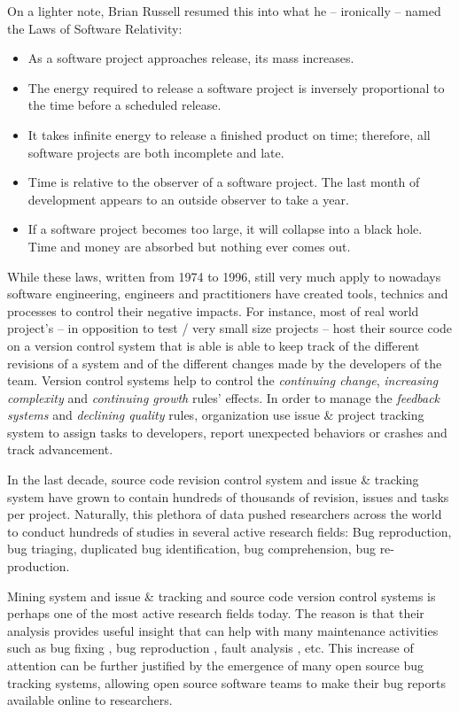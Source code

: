 On a lighter note, Brian Russell resumed this into what he -- ironically -- named the Laws of Software Relativity:

\begin{itemize}
\item As a software project approaches release, its mass increases.
\item The energy required to release a software project is inversely proportional to the time before a scheduled release.
\item It takes infinite energy to release a finished product on time; therefore, all software projects are both incomplete and late.
\item Time is relative to the observer of a software project. The last month of development appears to an outside observer to take a year.
\item If a software project becomes too large, it will collapse into a black hole. Time and money are absorbed but nothing ever comes out.
\end{itemize}

While these laws, written from 1974 to 1996, still very much apply to nowadays software engineering, engineers and practitioners have created tools, technics and processes to control their negative impacts.
For instance, most of real world project's -- in opposition to test / very small size projects -- host their source code on a version control system \cite{rochkind1975source} that is able is able to keep track of the different revisions of a system and of the different changes made by the developers of the team.
Version control systems help to control the {\it continuing change}, {\it increasing complexity} and {\it continuing growth} rules' effects.
In order to manage the {\it feedback systems} and {\it declining quality} rules, organization use issue \& project tracking system to assign tasks to developers, report unexpected behaviors or crashes and track advancement.

In the last decade, source code revision control system and issue \& tracking system have grown to contain hundreds of thousands of revision, issues and tasks per project.
Naturally, this plethora of data pushed researchers across the world to conduct hundreds of studies in several active research fields: Bug reproduction, bug triaging, duplicated bug identification, bug comprehension, bug re-production.

Mining system and issue \& tracking and source code version control systems is perhaps one of the most active research fields today. The reason is that their analysis provides useful insight that can help with many maintenance activities such as bug fixing \cite{Weiss2007,Saha2014}, bug reproduction \cite{Artzi2008,Jin2012,Chen2013}, fault analysis \cite{Jiang2012,Jin2013}, etc. This increase of attention can be further justified by the emergence of many open source bug tracking systems, allowing open source software teams to make their bug reports available online to researchers.

